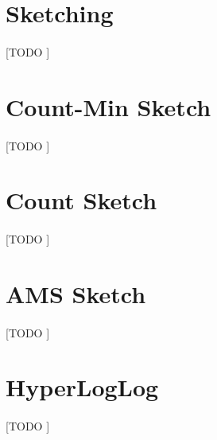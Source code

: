 \documentclass{subfiles}
\begin{document}
    \section{Sketching}
    \label{sec:sketching}

      \paragraph{}
      [TODO ]

    \section{Count-Min Sketch}
    \label{sec:count_min_sketch}

      \paragraph{}
      [TODO ]

    \section{Count Sketch}
    \label{sec:count_sketch}

      \paragraph{}
      [TODO ]

    \section{AMS Sketch}
    \label{sec:ams_sketch}

      \paragraph{}
      [TODO ]

    \section{HyperLogLog}
    \label{sec:hyper_log_log}

      \paragraph{}
      [TODO ]
\end{document}
